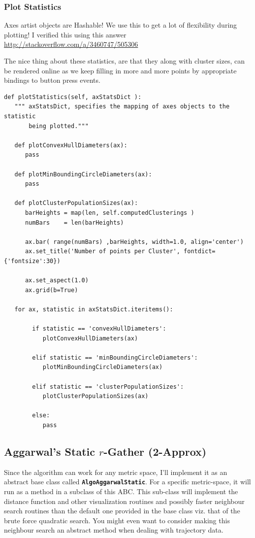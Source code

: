 \documentclass[11pt]{article}
\begin{document}
\subsubsection{Plot Statistics}
\label{sec-3-2-4}

Axes artist objects are Hashable! We use this to get a lot of flexibility 
during plotting! I verified this using this answer \url{http://stackoverflow.com/a/3460747/505306} 

The nice thing about these statistics, are that they along with cluster sizes, can be rendered 
online as we keep filling in more and more points by appropriate bindings to button press events. 

\begin{verbatim}
def plotStatistics(self, axStatsDict ):
   """ axStatsDict, specifies the mapping of axes objects to the statistic
       being plotted.""" 

   def plotConvexHullDiameters(ax):
      pass

   def plotMinBoundingCircleDiameters(ax):
      pass

   def plotClusterPopulationSizes(ax):
      barHeights = map(len, self.computedClusterings )
      numBars    = len(barHeights)

      ax.bar( range(numBars) ,barHeights, width=1.0, align='center')
      ax.set_title('Number of points per Cluster', fontdict={'fontsize':30})

      ax.set_aspect(1.0)
      ax.grid(b=True)

   for ax, statistic in axStatsDict.iteritems():

        if statistic == 'convexHullDiameters': 
           plotConvexHullDiameters(ax) 

        elif statistic == 'minBoundingCircleDiameters':
           plotMinBoundingCircleDiameters(ax)

        elif statistic == 'clusterPopulationSizes':
           plotClusterPopulationSizes(ax)

        else:
           pass
\end{verbatim}





\subsection{Aggarwal's Static $r$-Gather (2-Approx)}
\label{sec-3-3}
Since the algorithm can work for any metric space, I'll implement it as an abstract 
base class called \textbf{\verb~AlgoAggarwalStatic~}. For a specific metric-space, it will run as a 
method in a subclass of this ABC. This sub-class will implement the distance 
function and other visualization routines and possibly faster neighbour search routines
than the default one provided in the base class viz. that of the brute force quadratic
search. You might even want to consider making this neighbour search an abstract method 
when dealing with trajectory data. 
\end{document}
